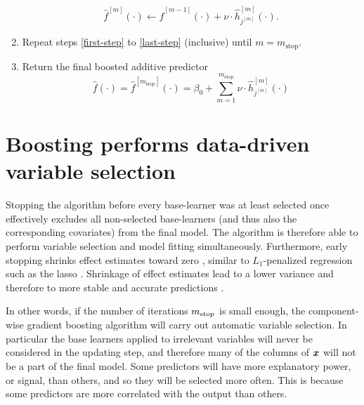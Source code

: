 \begin{algorithm}
\begin{enumerate}
        \begin{equation}
            \hat{f}^{[m]}(\cdot)\gets \hat{f}^{[m-1]}(\cdot)+\nu\cdot \hat{h}_{j^{[m]}}^{[m]}(\cdot).
        \end{equation}
    \item Repeat steps \ref{first-step} to \ref{last-step} (inclusive) until $m=m_{\text{stop}}$.
    \item Return the final boosted additive predictor
        \begin{equation}
            \hat{f}(\cdot)=\hat{f}^{[m_{\text{stop}}]}(\cdot)=\beta_0+\sum_{m=1}^{m_{\text{stop}}}\nu\cdot\hat{h}_{j^{[m]}}^{[m]}(\cdot)
        \end{equation}
\end{enumerate}
\end{algorithm}

\section{Boosting performs data-driven variable selection}\label{sec:variable-selection}
Stopping the algorithm before every base-learner was at least selected once effectively excludes all non-selected base-learners
(and thus also the corresponding covariates) from the final model.
The algorithm is therefore able to perform variable selection and model fitting simultaneously.
Furthermore, early stopping shrinks effect estimates toward zero \citep{buhlmann2007, DeBin2016}, similar to $L_1$-penalized regression
such as the lasso \citep{lasso, efron2004}.
Shrinkage of effect estimates lead to a lower variance and therefore to more stable and accurate predictions \citep{efron1975, copas1983, ESL}.


In other words, if the number of iterations $m_{\text{stop}}$ is small enough, the component-wise gradient boosting algorithm will carry out automatic variable selection.
In particular the base learners applied to irrelevant variables will never be considered in the updating step, and therefore many of the columns of $\bm{x}$ will not be a part of the final model.
Some predictors will have more explanatory power, or signal, than others, and so they will be selected more often.
This is because some predictors are more correlated with the output than others.


